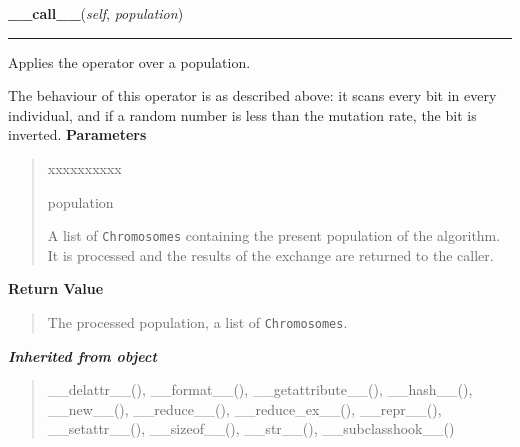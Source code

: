 \hspace{.8\funcindent}\begin{boxedminipage}{\funcwidth}

    \raggedright \textbf{\_\_call\_\_}(\textit{self}, \textit{population})

    \vspace{-1.5ex}

    \rule{\textwidth}{0.5\fboxrule}
\setlength{\parskip}{2ex}

Applies the operator over a population.

The behaviour of this operator is as described above: it scans every bit
in every individual, and if a random number is less than the mutation
rate, the bit is inverted.
\setlength{\parskip}{1ex}
      \textbf{Parameters}
      \vspace{-1ex}

      \begin{quote}
        \begin{Ventry}{xxxxxxxxxx}

          \item[population]


A list of \texttt{Chromosomes} containing the present population of the
algorithm. It is processed and the results of the exchange are
returned to the caller.
        \end{Ventry}

      \end{quote}

      \textbf{Return Value}
    \vspace{-1ex}

      \begin{quote}

The processed population, a list of \texttt{Chromosomes}.
      \end{quote}

    \end{boxedminipage}


\large{\textbf{\textit{Inherited from object}}}

\begin{quote}
\_\_delattr\_\_(), \_\_format\_\_(), \_\_getattribute\_\_(), \_\_hash\_\_(), \_\_new\_\_(), \_\_reduce\_\_(), \_\_reduce\_ex\_\_(), \_\_repr\_\_(), \_\_setattr\_\_(), \_\_sizeof\_\_(), \_\_str\_\_(), \_\_subclasshook\_\_()
\end{quote}


